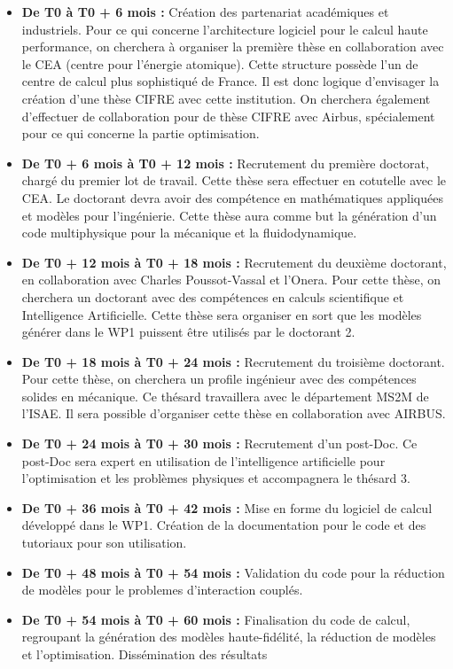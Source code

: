 \documentclass[12pt, french]{article}
\begin{document}
\begin{itemize}
	\item \textbf{De T0 à T0 + 6 mois :} Création des partenariat académiques et industriels.
	Pour ce qui concerne l'architecture logiciel pour le calcul haute performance, on cherchera à organiser la première thèse en collaboration avec le CEA (centre pour l'énergie atomique). Cette structure possède l'un de centre de calcul plus sophistiqué de France. Il est donc logique d'envisager la création d'une thèse CIFRE avec cette institution. On cherchera également d'effectuer de collaboration pour de thèse CIFRE avec Airbus, spécialement pour ce qui concerne la partie optimisation.
	\item \textbf{De T0 + 6 mois à T0 + 12 mois : } Recrutement du première doctorat, chargé du premier lot de travail. Cette thèse sera effectuer en cotutelle avec le CEA. Le doctorant devra avoir des compétence en mathématiques appliquées et modèles pour l'ingénierie. Cette thèse aura comme but la génération d'un code multiphysique pour la mécanique et la fluidodynamique.
	\item \textbf{De T0 + 12 mois à T0 + 18 mois : } Recrutement du deuxième doctorant, en collaboration avec Charles Poussot-Vassal et l'Onera. Pour cette thèse, on cherchera un doctorant avec des compétences en calculs scientifique et Intelligence Artificielle. Cette thèse sera organiser en sort que les modèles générer dans le WP1 puissent être utilisés par le doctorant 2.
	\item \textbf{De T0 + 18 mois à T0 + 24 mois : } Recrutement du troisième doctorant. Pour cette thèse, on cherchera un profile ingénieur avec des compétences solides en mécanique. Ce thésard travaillera avec le département MS2M de l'ISAE. Il sera possible d'organiser cette thèse en collaboration avec AIRBUS.
	\item \textbf{De T0 + 24 mois à T0 + 30 mois : } Recrutement d'un post-Doc. Ce post-Doc sera expert en utilisation de l'intelligence artificielle pour l'optimisation et les problèmes physiques et accompagnera le thésard 3. 
	\item \textbf{De T0 + 36 mois à T0 + 42 mois : } Mise en forme du logiciel de calcul développé dans le WP1. Création de la documentation pour le code et des tutoriaux pour son utilisation.
	\item \textbf{De T0 + 48 mois à T0 + 54 mois : } Validation du code pour la réduction de modèles pour le problemes d'interaction couplés.
	\item \textbf{De T0 + 54 mois à T0 + 60 mois : } Finalisation du code de calcul, regroupant la génération des modèles haute-fidélité, la réduction de modèles et l'optimisation. Dissémination des résultats
\end{itemize} 
\end{document}
